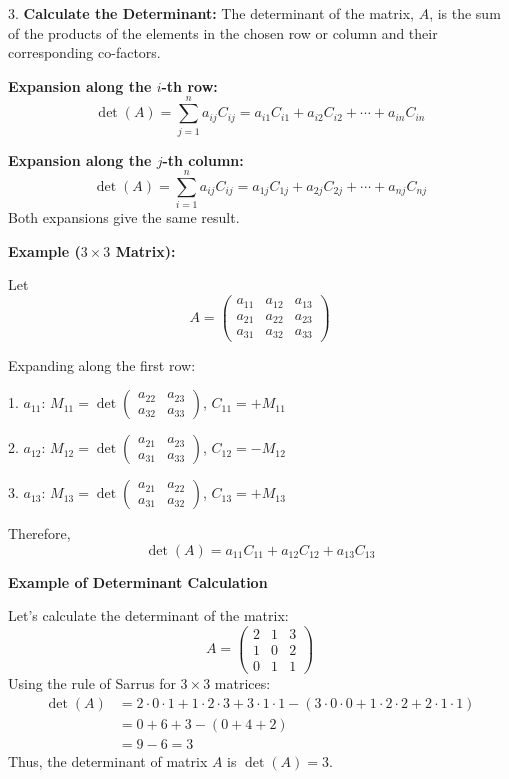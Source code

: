  3.\textbf{ Calculate the Determinant:} The determinant of the matrix, \(A\), is the sum of 
 the products of the elements in the chosen row or column and their corresponding co-factors.

    \textbf{Expansion along the \(i\)-th row:}
        \[
        \det(A) = \sum_{j=1}^{n} a_{ij} C_{ij} = a_{i1}C_{i1} + a_{i2}C_{i2} + \cdots + a_{in}C_{in}
        \]

    \textbf{Expansion along the \(j\)-th column:}
        \[
        \det(A) = \sum_{i=1}^{n} a_{ij} C_{ij} = a_{1j}C_{1j} + a_{2j}C_{2j} + \cdots + a_{nj}C_{nj}
        \]
        Both expansions give the same result.

\textbf{Example (\(3\times3\) Matrix):}

Let
\[
A = \begin{pmatrix}
a_{11} & a_{12} & a_{13} \\
a_{21} & a_{22} & a_{23} \\
a_{31} & a_{32} & a_{33}
\end{pmatrix}
\]

Expanding along the first row:

1. \(a_{11}\):  \(M_{11} = \det \begin{pmatrix} a_{22} & a_{23} \\ a_{32} & a_{33} \end{pmatrix}\),  \(C_{11} = +M_{11}\)

2. \(a_{12}\):  \(M_{12} = \det \begin{pmatrix} a_{21} & a_{23} \\ a_{31} & a_{33} \end{pmatrix}\),  \(C_{12} = -M_{12}\)

3. \(a_{13}\):  \(M_{13} = \det \begin{pmatrix} a_{21} & a_{22} \\ a_{31} & a_{32} \end{pmatrix}\),  \(C_{13} = +M_{13}\)

Therefore,
\[
\det(A) = a_{11}C_{11} + a_{12}C_{12} + a_{13}C_{13}
\]


\textbf{Example of Determinant Calculation}

Let's calculate the determinant of the matrix:
\begin{equation*}
A =
\begin{pmatrix}
2 & 1 & 3 \\
1 & 0 & 2 \\
0 & 1 & 1
\end{pmatrix}
\end{equation*}
Using the rule of Sarrus for \(3 \times 3\) matrices:
\begin{align*}
\det(A) &= 2 \cdot 0 \cdot 1 + 1 \cdot 2 \cdot 3 + 3 \cdot 1 \cdot 1 - (3 \cdot 0 \cdot 0 + 1 \cdot 2 \cdot 2 + 2 \cdot 1 \cdot 1) \\
&= 0 + 6 + 3 - (0 + 4 + 2) \\
&= 9 - 6 = 3
\end{align*}
 Thus, the determinant of matrix \(A\) is \(\det(A) = 3\).

